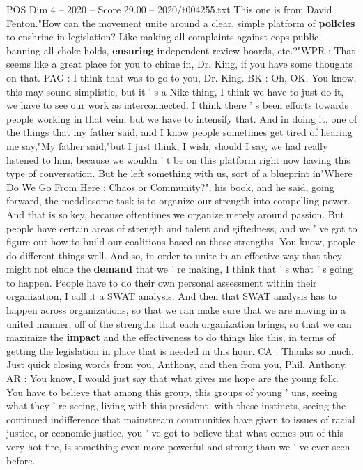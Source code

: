 \begin{textsample}{POS Dim 4 – 2020 – Score 29.00 – 2020/t004255.txt}
This one is from David Fenton."How can the movement unite around a clear, simple platform of \textbf{policies} to enshrine in legislation?
Like making all complaints against cops public, banning all choke holds, \textbf{ensuring} independent review boards, etc.?"WPR : That seems like a great place for you to chime in, Dr.
King, if you have some thoughts on that.
PAG : I think that was to go to you, Dr.
King.
BK : Oh, OK.
You know, this may sound simplistic, but it ' s a Nike thing, I think we have to just do it, we have to see our work as interconnected.
I think there ' s been efforts towards people working in that vein, but we have to intensify that.
And in doing it, one of the things that my father said, and I know people sometimes get tired of hearing me say,"My father said,"but I just think, I wish, should I say, we had really listened to him, because we wouldn ' t be on this platform right now having this type of conversation.
But he left something with us, sort of a blueprint in"Where Do We Go From Here : Chaos or Community?", his book, and he said, going forward, the meddlesome task is to organize our strength into compelling power.
And that is so key, because oftentimes we organize merely around passion.
But people have certain areas of strength and talent and giftedness, and we ' ve got to figure out how to build our coalitions based on these strengths.
You know, people do different things well.
And so, in order to unite in an effective way that they might not elude the \textbf{demand} that we ' re making, I think that ' s what ' s going to happen.
People have to do their own personal assessment within their organization, I call it a SWAT analysis.
And then that SWAT analysis has to happen across organizations, so that we can make sure that we are moving in a united manner, off of the strengths that each organization brings, so that we can maximize the \textbf{impact} and the effectiveness to do things like this, in terms of getting the legislation in place that is needed in this hour.
CA : Thanks so much.
Just quick closing words from you, Anthony, and then from you, Phil.
Anthony.
AR : You know, I would just say that what gives me hope are the young folk.
You have to believe that among this group, this groups of young ' uns, seeing what they ' re seeing, living with this president, with these instincts, seeing the continued indifference that mainstream communities have given to issues of racial justice, or economic justice, you ' ve got to believe that what comes out of this very hot fire, is something even more powerful and strong than we ' ve ever seen before.

\end{textsample}
